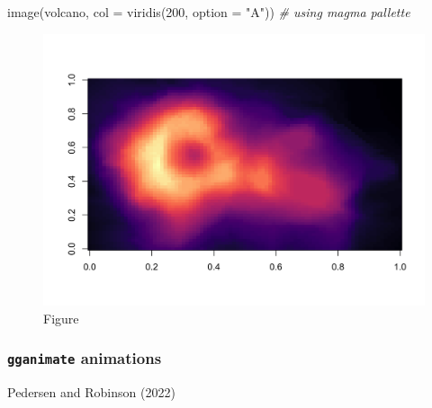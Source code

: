 \documentclass[
]{article}
\newenvironment{Shaded}{\begin{snugshade}}{\end{snugshade}}
\newcommand{\AttributeTok}[1]{\textcolor[rgb]{0.77,0.63,0.00}{#1}}
\newcommand{\CommentTok}[1]{\textcolor[rgb]{0.56,0.35,0.01}{\textit{#1}}}
\newcommand{\DecValTok}[1]{\textcolor[rgb]{0.00,0.00,0.81}{#1}}
\newcommand{\FunctionTok}[1]{\textcolor[rgb]{0.00,0.00,0.00}{#1}}
\newcommand{\NormalTok}[1]{#1}
\newcommand{\StringTok}[1]{\textcolor[rgb]{0.31,0.60,0.02}{#1}}
\begin{document}
\begin{Shaded}
\begin{Highlighting}[]
\FunctionTok{image}\NormalTok{(volcano, }\AttributeTok{col =} \FunctionTok{viridis}\NormalTok{(}\DecValTok{200}\NormalTok{, }\AttributeTok{option =} \StringTok{"A"}\NormalTok{))  }\CommentTok{\# using \textasciigrave{}magma\textasciigrave{} pallette}
\end{Highlighting}
\end{Shaded}

\begin{figure}
\centering
\includegraphics{figures/unnamed-chunk-8-1.png}
\caption{Figure}
\end{figure}

\hypertarget{gganimate-animations}{%
\subsubsection{\texorpdfstring{\texttt{gganimate}
animations}{gganimate animations}}\label{gganimate-animations}}

Pedersen and Robinson (2022)
\end{document}
